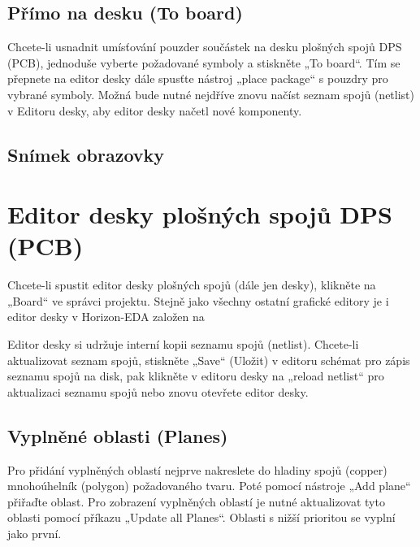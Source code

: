 \documentclass[letterpaper,10pt,czech]{sphinxmanual}
\begin{document}
\section{Přímo na desku (To board)}
\label{\detokenize{imp-sch:primo-na-desku-to-board}}
Chcete-li usnadnit umísťování pouzder součástek na desku plošných spojů DPS (PCB), jednoduše vyberte
požadované symboly a stiskněte „To board“. Tím se přepnete na editor desky dále spusťte nástroj „place package“ s pouzdry pro vybrané symboly. Možná bude nutné nejdříve znovu načíst seznam spojů (netlist) v Editoru desky, aby editor desky načetl nové komponenty.


\section{Snímek obrazovky}
\label{\detokenize{imp-sch:snimek-obrazovky}}
\begin{figure}[htbp]
\centering

\noindent{}
\end{figure}


\chapter{Editor desky plošných spojů DPS (PCB)}
\label{\detokenize{imp-board:editor-desky-plosnych-spoju-dps-pcb}}\label{\detokenize{imp-board::doc}}
Chcete-li spustit editor desky plošných spojů (dále jen desky), klikněte na „Board“ ve správci projektu. Stejně jako všechny ostatní grafické editory je i editor desky v Horizon-EDA založen na 

Editor desky si udržuje interní kopii seznamu spojů (netlist). Chcete-li aktualizovat
seznam spojů, stiskněte „Save“ (Uložit) v editoru schémat pro zápis seznamu spojů na
disk, pak klikněte v editoru desky na „reload netlist“ pro aktualizaci seznamu spojů nebo znovu otevřete editor desky.


\section{Vyplněné oblasti (Planes)}
\label{\detokenize{imp-board:vyplnene-oblasti-planes}}
Pro přidání vyplněných oblastí nejprve nakreslete do hladiny spojů (copper) mnohoúhelník (polygon) požadovaného tvaru. Poté pomocí nástroje „Add plane“ přiřaďte oblast. Pro zobrazení vyplněných oblastí je nutné aktualizovat tyto oblasti pomocí příkazu „Update all Planes“. Oblasti s
nižší prioritou se vyplní jako první.
\end{document}
